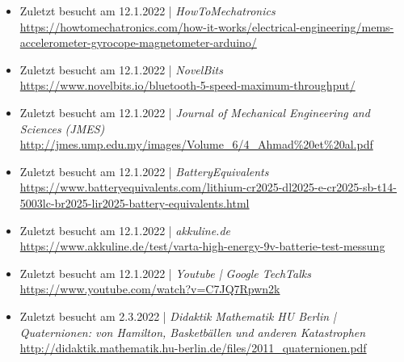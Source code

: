 \begin{itemize}
    \item Zuletzt besucht am 12.1.2022 | \textit{HowToMechatronics}\\
        \url{https://howtomechatronics.com/how-it-works/electrical-engineering/mems-accelerometer-gyrocope-magnetometer-arduino/}
    \item Zuletzt besucht am 12.1.2022 | \textit{NovelBits} \\
        \url{https://www.novelbits.io/bluetooth-5-speed-maximum-throughput/}
    \item Zuletzt besucht am 12.1.2022 | \textit{Journal of Mechanical Engineering and Sciences (JMES)} \\
        \url{http://jmes.ump.edu.my/images/Volume_6/4_Ahmad%20et%20al.pdf}
    \item Zuletzt besucht am 12.1.2022 | \textit{BatteryEquivalents}\\
        \url{https://www.batteryequivalents.com/lithium-cr2025-dl2025-e-cr2025-sb-t14-5003lc-br2025-lir2025-battery-equivalents.html}
    \item Zuletzt besucht am 12.1.2022 | \textit{akkuline.de}\\
        \url{https://www.akkuline.de/test/varta-high-energy-9v-batterie-test-messung}
    \item Zuletzt besucht am 12.1.2022 | \textit{Youtube | Google TechTalks} \\
        \url{https://www.youtube.com/watch?v=C7JQ7Rpwn2k}
    \item Zuletzt besucht am 2.3.2022 | \textit{Didaktik Mathematik HU Berlin | Quaternionen: von Hamilton, Basketbällen und anderen Katastrophen}
        \url{http://didaktik.mathematik.hu-berlin.de/files/2011_quaternionen.pdf}
\end{itemize}